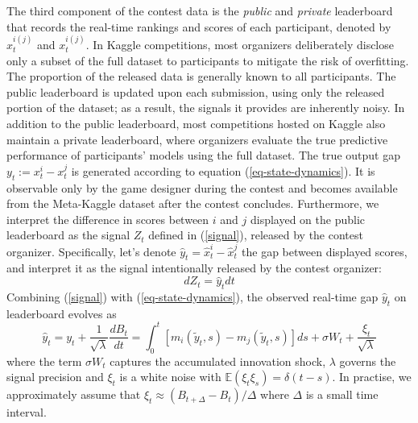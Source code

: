 \documentclass[mnsc]{informs3}
\begin{document}
The third component of the contest data is the \textit{public} and \textit{private} leaderboard that records the real-time rankings and scores of each participant, denoted by $\hat{x}^{i(j)}_t$ and $x^{i(j)}_t$. 
In Kaggle competitions, most organizers deliberately disclose only a subset of the full dataset to participants to mitigate the risk of overfitting. 
The proportion of the released data is generally known to all participants. 
The public leaderboard is updated upon each submission, using only the released portion of the dataset; as a result, the signals it provides are inherently noisy.
In addition to the public leaderboard, most competitions hosted on Kaggle also maintain a private leaderboard, where organizers evaluate the true predictive performance of participants’ models using the full dataset.
The true output gap $y_t := x^i_t - x^j_t$ is generated according to equation (\ref{eq-state-dynamics}).
It is observable only by the game designer during the contest and becomes available from the Meta-Kaggle dataset after the contest concludes. 
Furthermore, we interpret the difference in scores between $i$ and $j$ displayed on the public leaderboard as the signal $Z_t$ defined in (\ref{signal}), released by the contest organizer. 
Specifically, let's denote $\hat{y}_t = \hat{x}^i_t - \hat{x}^j_t$ the gap between displayed scores, and interpret it as the signal intentionally released by the contest organizer: 
\begin{equation}\label{eq-model-signal}
dZ_t = \hat{y}_tdt
\end{equation}
Combining (\ref{signal}) with (\ref{eq-state-dynamics}), the observed real-time gap $\hat{y}_t$ on leaderboard evolves as 
\begin{equation}\label{eq-leaderboard-gap}
\hat{y}_t = y_t + \frac{1}{\sqrt{\lambda}}\frac{dB_t}{dt} = \int^t_0\left[m_i(\tilde{y}_t, s) - m_j(\tilde{y}_t, s)\right]ds + \sigma W_{t} + \frac{\xi_t}{\sqrt{\lambda}}
\end{equation}
where the term $\sigma W_t$ captures the accumulated innovation shock, $\lambda$ governs the signal precision and $\xi_t$ is a white noise with $\mathbb{E}(\xi_t\xi_s) = \delta(t-s)$. 
In practise, we approximately assume that $\xi_t \approx (B_{t+\Delta} - B_t)/\Delta$ where $\Delta$ is a small time interval. 
\end{document}

